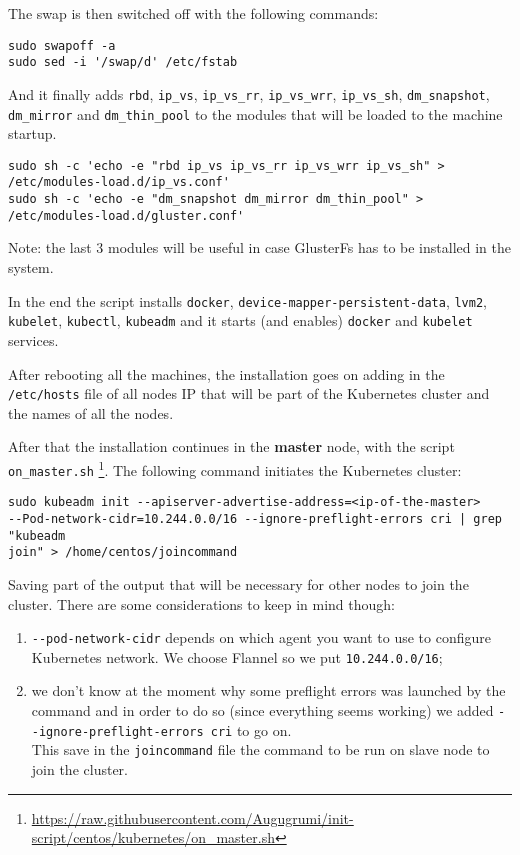 The swap is then switched off with the following commands:
\begin{lstlisting}
sudo swapoff -a
sudo sed -i '/swap/d' /etc/fstab
\end{lstlisting}

And it finally adds \texttt{rbd}, \texttt{ip\_vs}, \texttt{ip\_vs\_rr},
\texttt{ip\_vs\_wrr}, \texttt{ip\_vs\_sh}, \texttt{dm\_snapshot},
\texttt{dm\_mirror} and \texttt{dm\_thin\_pool} to the modules that will be
loaded to the machine startup.
\begin{lstlisting}
sudo sh -c 'echo -e "rbd ip_vs ip_vs_rr ip_vs_wrr ip_vs_sh" >  
/etc/modules-load.d/ip_vs.conf'
sudo sh -c 'echo -e "dm_snapshot dm_mirror dm_thin_pool" >  
/etc/modules-load.d/gluster.conf'
\end{lstlisting}

Note: the last 3 modules will be useful in case GlusterFs has to be installed 
in the system.

In the end the script installs \texttt{docker}, 
\texttt{device-mapper-persistent-data}, \texttt{lvm2}, \texttt{kubelet},
\texttt{kubectl}, \texttt{kubeadm} and it starts (and enables)
\texttt{docker} and \texttt{kubelet} services.

After rebooting all the machines, the installation goes on adding in the
\texttt{/etc/hosts} file of all nodes IP that will be part of the Kubernetes
cluster and the names of all the nodes.

After that the installation continues in the \textbf{master} node, with the 
script \verb!on_master.sh!
\footnote{\url{https://raw.githubusercontent.com/Augugrumi/init-script/centos/kubernetes/on_master.sh}}.
The following command initiates the Kubernetes cluster:
\begin{lstlisting}
sudo kubeadm init --apiserver-advertise-address=<ip-of-the-master> 
--Pod-network-cidr=10.244.0.0/16 --ignore-preflight-errors cri | grep "kubeadm 
join" > /home/centos/joincommand
\end{lstlisting}

\noindent Saving part of the output that will be necessary for other nodes to 
join the cluster. There are some considerations to keep in mind though:
\begin{enumerate}
 \item \texttt{-\/-pod-network-cidr} depends on which agent you want to
use to configure Kubernetes network. We choose Flannel so we put
\texttt{10.244.0.0/16};
 \item we don't know at the moment why some preflight errors was
launched by the command and in order to do so (since everything seems
working) we added \texttt{-\/-ignore-preflight-errors\ cri} to go on.\\
This save in the \texttt{joincommand} file the command to be run on
slave node to join the cluster.
\end{enumerate}

